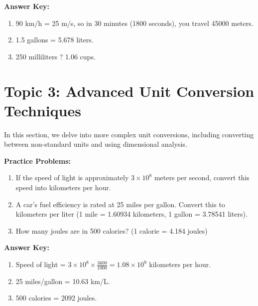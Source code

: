 \documentclass{article}
\begin{document}
\textbf{Answer Key:}
\begin{enumerate}
    \item 90 km/h = 25 m/s, so in 30 minutes (1800 seconds), you travel 45000 meters.
    \item 1.5 gallons = 5.678 liters.
    \item 250 milliliters ? 1.06 cups.
\end{enumerate}

\section*{Topic 3: Advanced Unit Conversion Techniques}
In this section, we delve into more complex unit conversions, including converting between non-standard units and using dimensional analysis.

\textbf{Practice Problems:}
\begin{enumerate}
    \item If the speed of light is approximately \(3 \times 10^8\) meters per second, convert this speed into kilometers per hour.
    \item A car's fuel efficiency is rated at 25 miles per gallon. Convert this to kilometers per liter (1 mile = 1.60934 kilometers, 1 gallon = 3.78541 liters).
    \item How many joules are in 500 calories? (1 calorie = 4.184 joules)
\end{enumerate}

\textbf{Answer Key:}
\begin{enumerate}
    \item Speed of light = \(3 \times 10^8 \times \frac{3600}{1000} = 1.08 \times 10^9\) kilometers per hour.
    \item 25 miles/gallon = 10.63 km/L.
    \item 500 calories = 2092 joules.
\end{enumerate}
\end{document}
